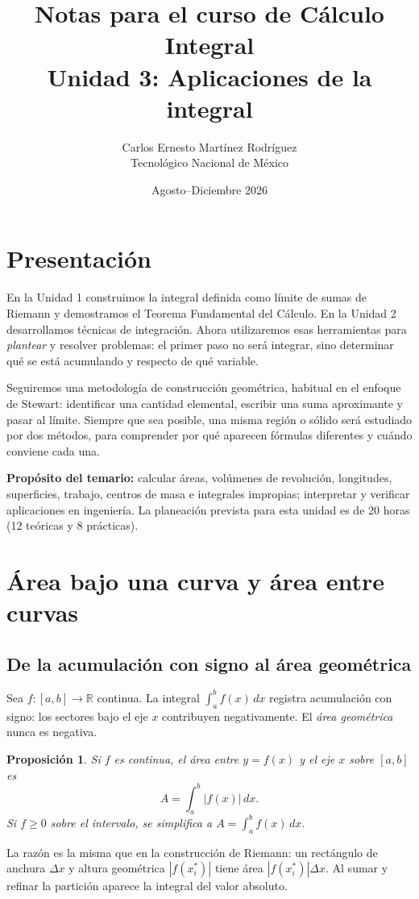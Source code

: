 \documentclass[12pt]{article}
\title{\textbf{Notas para el curso de Cálculo Integral}\\[0.3cm]\Large Unidad 3: Aplicaciones de la integral}
\author{Carlos Ernesto Martínez Rodríguez\\Tecnológico Nacional de México}
\date{Agosto--Diciembre 2026}
\newtheorem{proposicion}[teorema]{Proposición}
\theoremstyle{definition}
\theoremstyle{remark}
\newcommand{\R}{\mathbb{R}}
\newcommand{\dd}{\,dx}
\begin{document}
\maketitle
\tableofcontents
\newpage
\section*{Presentación}
En la Unidad 1 construimos la integral definida como límite de sumas de Riemann y demostramos el Teorema Fundamental del Cálculo. En la Unidad 2 desarrollamos técnicas de integración. Ahora utilizaremos esas herramientas para \emph{plantear} y resolver problemas: el primer paso no será integrar, sino determinar qué se está acumulando y respecto de qué variable.

Seguiremos una metodología de construcción geométrica, habitual en el enfoque de Stewart: identificar una cantidad elemental, escribir una suma aproximante y pasar al límite. Siempre que sea posible, una misma región o sólido será estudiado por dos métodos, para comprender por qué aparecen fórmulas diferentes y cuándo conviene cada una.

\textbf{Propósito del temario:} calcular áreas, volúmenes de revolución, longitudes, superficies, trabajo, centros de masa e integrales impropias; interpretar y verificar aplicaciones en ingeniería. La planeación prevista para esta unidad es de 20 horas (12 teóricas y 8 prácticas).

\section{Área bajo una curva y área entre curvas}
\subsection*{De la acumulación con signo al área geométrica}
Sea $f:[a,b]\to\R$ continua. La integral $\int_a^b f(x)\dd$ registra acumulación con signo: los sectores bajo el eje $x$ contribuyen negativamente. El \emph{área geométrica} nunca es negativa.
\begin{proposicion}
Si $f$ es continua, el área entre $y=f(x)$ y el eje $x$ sobre $[a,b]$ es
\[\boxed{A=\int_a^b |f(x)|\dd.}\]
Si $f\geq0$ sobre el intervalo, se simplifica a $A=\int_a^b f(x)\dd$.
\end{proposicion}
La razón es la misma que en la construcción de Riemann: un rectángulo de anchura $\Delta x$ y altura geométrica $|f(x_i^*)|$ tiene área $|f(x_i^*)|\Delta x$. Al sumar y refinar la partición aparece la integral del valor absoluto.
\end{document}

